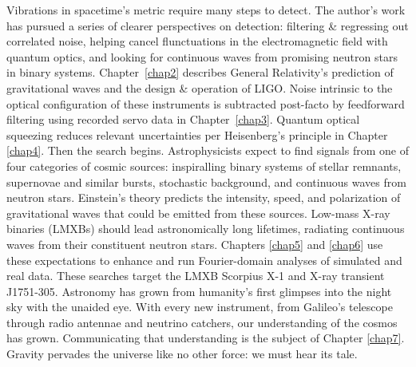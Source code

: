 Vibrations in spacetime's metric require many steps to detect.
The author's work has pursued a series of clearer perspectives on detection: filtering \& regressing out correlated noise, helping cancel flunctuations in the electromagnetic field with quantum optics, and looking for continuous waves from promising neutron stars in binary systems. 
Chapter~\ref{chap2} describes General Relativity's prediction of gravitational waves and the design \& operation of LIGO.
Noise intrinsic to the optical configuration of these instruments is subtracted post-facto by feedforward filtering using recorded servo data in Chapter~\ref{chap3}. 
Quantum optical squeezing reduces relevant uncertainties per Heisenberg's principle in Chapter \ref{chap4}.
Then the search begins.
Astrophysicists expect to find signals from one of four categories of cosmic sources: inspiralling binary systems of stellar remnants, supernovae and similar bursts, stochastic background, and continuous waves from neutron stars.
Einstein's theory predicts the intensity, speed, and polarization of gravitational waves that could be emitted from these sources.
Low-mass X-ray binaries (LMXBs) should lead astronomically long lifetimes, radiating continuous waves from their constituent neutron stars.
Chapters \ref{chap5} and \ref{chap6} use these expectations to enhance and run Fourier-domain analyses of simulated and real data.
These searches target the LMXB Scorpius X-1 and X-ray transient J1751-305.
Astronomy has grown from humanity's first glimpses into the night sky with the unaided eye. 
With every new instrument, from Galileo's telescope through radio antennae and neutrino catchers, our understanding of the cosmos has grown. 
Communicating that understanding is the subject of Chapter \ref{chap7}.
Gravity pervades the universe like no other force: we must hear its tale. 
        

            
%

